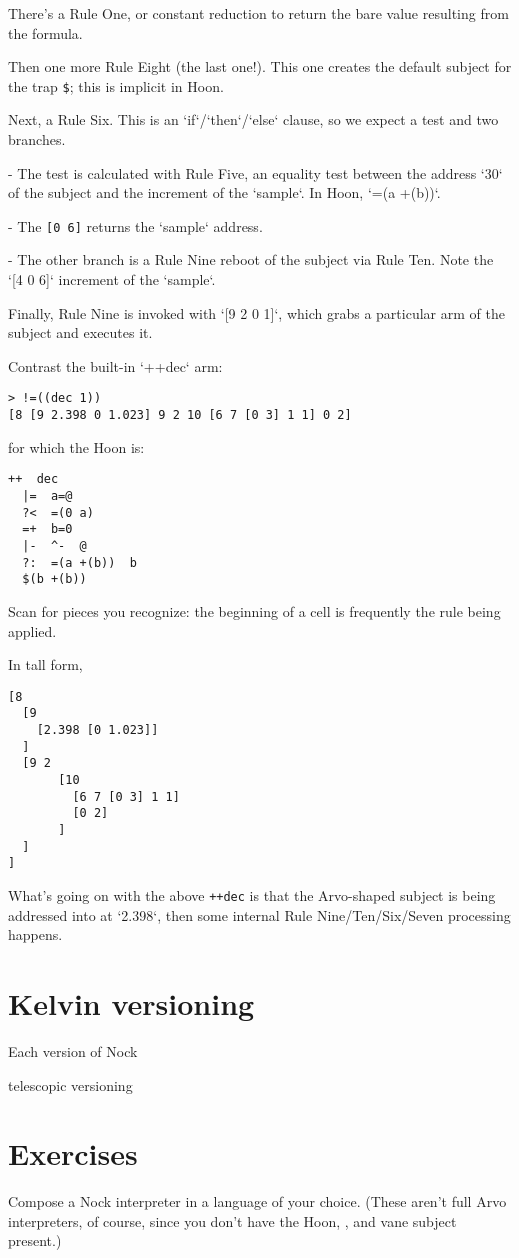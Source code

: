 There's a Rule One, or constant reduction to return the bare value resulting from the formula.

Then one more Rule Eight (the last one!).  This one creates the default subject for the trap \texttt{\$}; this is implicit in Hoon.

Next, a Rule Six.  This is an `if`/`then`/`else` clause, so we expect a test and two branches.

- The test is calculated with Rule Five, an equality test between the address `30` of the subject and the increment of the `sample`.  In Hoon, `=(a +(b))`.

- The \texttt{[0 6]} returns the `sample` address.

- The other branch is a Rule Nine reboot of the subject via Rule Ten.  Note the `[4 0 6]` increment of the `sample`.

Finally, Rule Nine is invoked with `[9 2 0 1]`, which grabs a particular arm of the subject and executes it.

Contrast the built-in `++dec` arm:

\begin{lstlisting}
> !=((dec 1))
[8 [9 2.398 0 1.023] 9 2 10 [6 7 [0 3] 1 1] 0 2]
\end{lstlisting}

for which the Hoon is:


\begin{lstlisting}
++  dec
  |=  a=@
  ?<  =(0 a)
  =+  b=0
  |-  ^-  @
  ?:  =(a +(b))  b
  $(b +(b))
\end{lstlisting}

Scan for pieces you recognize:  the beginning of a cell is frequently the rule being applied.

In tall form,

\begin{lstlisting}
[8
  [9
    [2.398 [0 1.023]]
  ]
  [9 2
       [10
         [6 7 [0 3] 1 1]
         [0 2]
       ]
  ]
]
\end{lstlisting}

What's going on with the above \texttt{++dec} is that the Arvo-shaped subject is being addressed into at `2.398`, then some internal Rule Nine/Ten/Six/Seven processing happens.

\section{Kelvin versioning}

Each version of Nock

telescopic versioning

\section{Exercises}

Compose a Nock interpreter in a language of your choice.  (These aren't full Arvo interpreters, of course, since you don't have the Hoon, \zuse, and vane subject present.)
